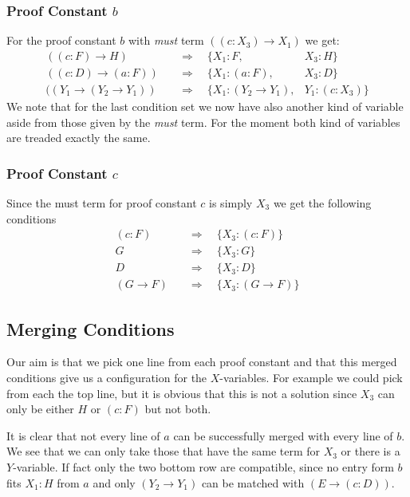 \subsubsection[look up proof constant b]{Proof Constant $b$}
For the proof constant $b$ with \emph{must} term $((c:X_3) \rightarrow X_1)$ we get:
\begin{align}
	((c:F) \rightarrow H) & \quad \Rightarrow \quad \{X_1: F, & X_3: H\}\\ 
	((c:D) \rightarrow (a:F)) & \quad \Rightarrow \quad \{X_1: (a:F), & X_3: D\}\\ 
	((Y_1 \rightarrow (Y_2 \rightarrow Y_1)) & \quad \Rightarrow \quad \{X_1: (Y_2 \rightarrow Y_1), & Y_1: (c:X_3)\} \label{condition:b}
\end{align}
We note that for the last condition set we now have also another kind of variable aside from those given by the \emph{must} term. For the moment both kind of variables are treaded exactly the same.

\subsubsection[look up proof constant c]{Proof Constant $c$}
Since the must term for proof constant $c$ is simply $X_3$ we get the following conditions 
\begin{align}
	(c:F) & \quad \Rightarrow \quad \{X_3: (c:F)\} \\ 
	G & \quad \Rightarrow \quad \{X_3: G\} \\ 
	D & \quad \Rightarrow \quad \{X_3: D\}\label{condition:c} \\ 
	(G \rightarrow F) & \quad \Rightarrow \quad \{X_3: (G \rightarrow F)\} 
\end{align}

\subsection{Merging Conditions}
Our aim is that we pick one line from each proof constant and that this merged conditions give us a configuration for the $X$-variables. For example we could pick from each the top line, but it is obvious that this is not a solution since $X_3$ can only be either $H$ or $(c:F)$ but not both.

It is clear that not every line of $a$ can be successfully merged with every line of $b$. We see that we can only take those that have the same term for $X_3$ or there is a $Y$-variable. If fact only the two bottom row are compatible, since no entry form $b$ fits $X_1: H$ from $a$ and only $(Y_2 \rightarrow Y_1)$ can be matched with $(E \rightarrow (c:D))$.

